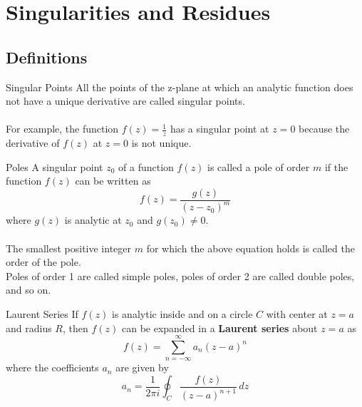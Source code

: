 
\section{Singularities and Residues}
\subsection{Definitions}
\begin{definition}{Singular Points}{}
    All the points of the z-plane at which an analytic function does not have a unique derivative are called singular points.  \\~\\
    
    For example, the function $f(z) = \frac{1}{z}$ has a singular point at $z = 0$ because the derivative of $f(z)$ at $z = 0$ is not unique.
\end{definition}

\begin{definition}{Poles}{}
    A singular point $z_0$ of a function $f(z)$ is called a pole of order $m$ if the function $f(z)$ can be written as
    \[ f(z) = \frac{g(z)}{(z - z_0)^m} \]
    where $g(z)$ is analytic at $z_0$ and $g(z_0) \neq 0$. \\~\\
    
    The smallest positive integer $m$ for which the above equation holds is called the order of the pole. \\
    Poles of order 1 are called simple poles, poles of order 2 are called double poles, and so on.
\end{definition}

\begin{definition}{Laurent Series}{}
    If $f(z)$ is analytic inside and on a circle $C$ with center at $z=a$ and radius $R$, then $f(z)$ can be expanded in a \textbf{Laurent series} about $z=a$ as
    \begin{equation}
        f(z) = \sum_{n=-\infty}^{\infty} a_n (z-a)^n
    \end{equation}
    where the coefficients $a_n$ are given by
    \[ a_n = \frac{1}{2\pi i} \oint_C \frac{f(z)}{(z-a)^{n+1}} \, dz \]
\end{definition}

